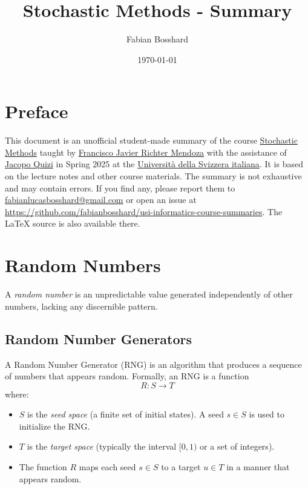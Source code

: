 \documentclass[10pt, headings=standardclasses, parskip=half, twoside]{scrartcl}
\title{Stochastic Methods - Summary}
\author{Fabian Bosshard}
\date{\today}
\begin{document}
\maketitle


\thispagestyle{empty}
\tableofcontents

\section*{Preface}

This document is an unofficial student-made summary of the course
\href{https://search.usi.ch/en/courses/35270722/stochastic-methods}{Stochastic Methods} taught by \href{https://search.usi.ch/en/people/fd79a01270bbee6228453cacbb95a6c5/richter-mendoza-francisco-javier}{Francisco Javier Richter Mendoza} with the assistance of \href{https://search.usi.ch/en/people/41cc6fa578d8e9a32c12472007ae5ee9/quizi-jacopo}{Jacopo Quizi} in Spring 2025 at the \href{https://www.usi.ch/en}{Università della Svizzera italiana}.
It is based on the lecture notes and other course materials.
The summary is not exhaustive and may contain errors.
If you find any, please report them to \href{mailto:fabianlucasbosshard@gmail.com}{fabianlucasbosshard@gmail.com} or open an issue at \url{https://github.com/fabianbosshard/usi-informatics-course-summaries}.
The \LaTeX{} source is also available there.

\doclicenseThis



\clearpage
{}
\section{Random Numbers}
A \textit{random number} is an unpredictable value generated independently of other numbers, lacking any discernible pattern.

\subsection{Random Number Generators}

\begin{definition}
    A Random Number Generator (RNG) is an algorithm that produces a sequence of numbers that appears random. Formally, an RNG is a function
    \[
    R: S \rightarrow T
    \]
    where:
    \begin{itemize}[before={\parskip=0pt}, nosep]
        \item $S$ is the \textit{seed space} (a finite set of initial states). A seed \(s \in S\) is used to initialize the RNG.
        \item $T$ is the \textit{target space} (typically the interval $[0,1)$ or a set of integers).
        \item The function $R$ maps each seed $s \in S$ to a target $u \in T$ in a manner that appears random. \qedhere
    \end{itemize}
\end{definition}
\end{document}
